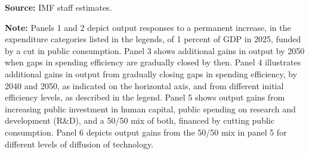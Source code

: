 \documentclass[a4paper,10pt]{article}
\begin{document}
\vspace{0.3cm}

{\small
\noindent\textbf{Source:} IMF staff estimates.

\smallskip

\noindent\textbf{Note:} Panels 1 and 2 depict output responses to a permanent increase, in the expenditure categories listed in the legends, of 1 percent of GDP in 2025, funded by a cut in public consumption. Panel 3 shows additional gains in output by 2050 when gaps in spending efficiency are gradually closed by then. Panel 4 illustrates additional gains in output from gradually closing gaps in spending efficiency, by 2040 and 2050, as indicated on the horizontal axis, and from different initial efficiency levels, as described in the legend. Panel 5 shows output gains from increasing public investment in human capital, public spending on research and development (R\&D), and a 50/50 mix of both, financed by cutting public consumption. Panel 6 depicts output gains from the 50/50 mix in panel 5 for different levels of diffusion of technology.
\par}
\end{document}
